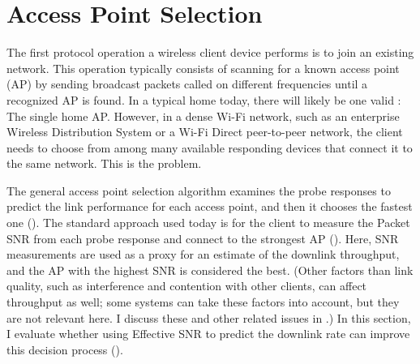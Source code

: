 \section{Access Point Selection}\label{sec:esnr_apsel}
The first protocol operation a wireless client device performs is to join an existing network. This operation typically consists of scanning for a known access point (AP) by sending broadcast packets called  on different frequencies until a recognized AP is found. In a typical home today, there will likely be one valid : The single home AP. However, in a dense Wi-Fi network, such as an enterprise Wireless Distribution System or a Wi-Fi Direct peer-to-peer network, the client needs to choose from among many available responding devices that connect it to the same network. This is the  problem.

The general access point selection algorithm examines the probe responses to predict the link performance for each access point, and then it chooses the fastest one (). The standard approach used today is for the client to measure the Packet SNR from each probe response and connect to the strongest AP (). Here, SNR measurements are used as a proxy for an estimate of the downlink throughput, and the AP with the highest SNR is considered the best. (Other factors than link quality, such as interference and contention with other clients, can affect throughput as well; some systems can take these factors into account, but they are not relevant here. I discuss these and other related issues in .)
In this section, I evaluate whether using Effective SNR to predict the downlink rate can improve this decision process ().


